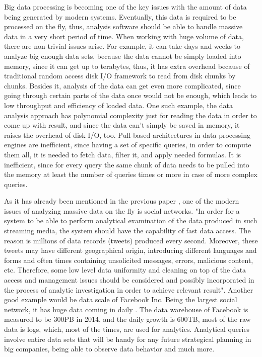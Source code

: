 \documentclass[11pt,a4paper]{report}
\begin{document}
Big data processing is becoming one of the key issues with the amount of data being generated by modern systems. Eventually, this data is required to be processed on the fly, thus, analysis software should be able to handle massive data in a very short period of time. When working with huge volume of data, there are non-trivial issues arise. For example, it can take days and weeks to analyze big enough data sets, because the data cannot be simply loaded into memory, since it can get up to terabytes, thus, it has extra overhead because of traditional random access disk I/O framework to read from disk chunks by chunks. Besides it, analysis of the data can get even more complicated, since going through certain parts of the data once would not be enough, which leads to low throughput and efficiency of loaded data. One such example, the data analysis approach has polynomial complexity just for reading the data in order to come up with result, and since the data can't simply be saved in memory, it raises the overhead of disk I/O, too. Pull-based architectures in data processing engines are inefficient, since having a set of specific queries, in order to compute them all, it is needed to fetch data, filter it, and apply needed formulas. It is inefficient, since for every query the same chunk of data needs to be pulled into the memory at least the number of queries times or more in case of more complex queries.

As it has already been mentioned in the previous paper \cite{mainPaper}, one of the modern issues of analyzing massive data on the fly is social networks. "In order for a system to be able to perform analytical examination of the data produced in such streaming media, the system should have the capability of fast data access. The reason is millions of data records (tweets) produced every second. Moreover, these tweets may have different geographical origin, introducing different languages and forms and often times containing unsolicited messages, errors,
malicious content, etc. Therefore, some low level data uniformity
and cleaning on top of the data access and management issues should
be considered and possibly incorporated in the process of analytic
investigation in order to achieve relevant result".\cite{mainPaper, nature_bigdata08,nature_bigdata12,science_social10,jcs_twitter11} Another good example would be data scale of Facebook Inc. Being the largest social network, it has huge data coming in daily \cite{fbStats}. The data warehouse of Facebook is measured to be 300PB in 2014, and the daily growth is 600TB, most of the raw data is logs, which, most of the times, are used for analytics. Analytical queries involve entire data sets that will be handy for any future strategical planning in big companies, being able to observe data behavior and much more.
\end{document}
